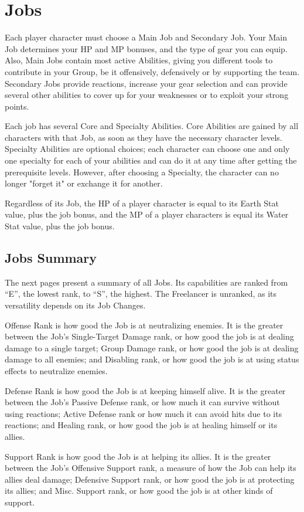 \section{Jobs}
\begin{multicols}{2}
Each player character must choose a Main
Job and Secondary Job. Your Main Job determines
your HP and MP bonuses, and the type of gear you
can equip. Also, Main Jobs contain most active
Abilities, giving you different tools to contribute in
your Group, be it offensively, defensively or by
supporting the team. Secondary Jobs provide
reactions, increase your gear selection and can
provide several other abilities to cover up for your
weaknesses or to exploit your strong points.

Each job has several Core and Specialty
Abilities. Core Abilities are gained by all characters
with that Job, as soon as they have the necessary
character levels. Specialty Abilities are optional
choices; each character can choose one and only
one specialty for each of your abilities and can do
it at any time after getting the prerequisite levels.
However, after choosing a Specialty, the character
can no longer "forget it" or exchange it for another.

Regardless of its Job, the HP of a player
character is equal to its Earth Stat value, plus the
job bonus, and the MP of a player characters is
equal its Water Stat value, plus the job bonus.

\subsection{Jobs Summary}
The next pages present a summary of all
Jobs. Its capabilities are ranked from “E”, the
lowest rank, to “S”, the highest. The Freelancer is
unranked, as its versatility depends on its Job
Changes.

Offense Rank is how good the Job is at
neutralizing enemies. It is the greater between the
Job's Single-Target Damage rank, or how good the
job is at dealing damage to a single target; Group
Damage rank, or how good the job is at dealing
damage to all enemies; and Disabling rank, or how
good the job is at using status effects to neutralize
enemies.

Defense Rank is how good the Job is at
keeping himself alive. It is the greater between the
Job's Passive Defense rank, or how much it can
survive without using reactions; Active Defense
rank or how much it can avoid hits due to its
reactions; and Healing rank, or how good the job is
at healing himself or its allies.

Support Rank is how good the Job is at
helping its allies. It is the greater between the Job's
Offensive Support rank, a measure of how the Job
can help its allies deal damage; Defensive Support
rank, or how good the job is at protecting its allies;
and Misc. Support rank, or how good the job is at
other kinds of support.
\end{multicols}


